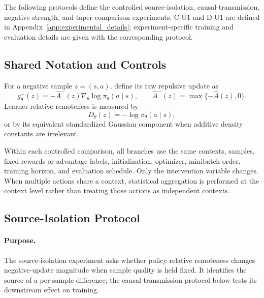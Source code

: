 \documentclass{article}
\theoremstyle{plain}
\theoremstyle{definition}
\theoremstyle{remark}
\begin{document}
The following protocols define the controlled source-isolation,
causal-transmission, negative-strength, and taper-comparison experiments.
C-U1 and D-U1 are defined in Appendix~\ref{app:experimental_details};
experiment-specific training and evaluation details are given with the
corresponding protocol.

\subsection{Shared Notation and Controls}
\label{app:controlled_shared}

For a negative sample
$z=(s,a)$, define its raw repulsive update as
\begin{equation}
    g_\theta^-(z)
    =
    -\widehat A^-(z)
    \nabla_\theta
    \log\pi_\theta(a\mid s),
    \qquad
    \widehat A^-(z)
    =
    \max\{-\widehat A(z),0\}.
    \label{eq:controlled_negative_update}
\end{equation}
Learner-relative remoteness is measured by
\begin{equation}
    D_\theta(z)
    =
    -\log\pi_\theta(a\mid s),
    \label{eq:controlled_remoteness}
\end{equation}
or by its equivalent standardized Gaussian component when additive
density constants are irrelevant.

Within each controlled comparison, all branches use the same contexts,
samples, fixed rewards or advantage labels, initialization, optimizer,
minibatch order, training horizon, and evaluation schedule. Only the
intervention variable changes. When multiple actions share a context,
statistical aggregation is performed at the context level rather than treating
those actions as independent contexts.


\subsection{Source-Isolation Protocol}
\label{app:source_isolation_protocol}

\paragraph{Purpose.}
The source-isolation experiment asks whether policy-relative remoteness
changes negative-update magnitude when sample quality is held fixed. It
identifies the source of a per-sample difference; the causal-transmission
protocol below tests its downstream effect on training.
\end{document}
